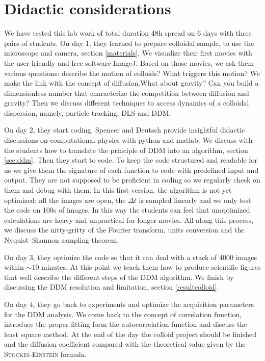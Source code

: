 \documentclass[%
 aip,
 jmp,%
 amsmath,amssymb,
reprint,%
]{revtex4-1}
\begin{document}
\section{\label{didac}Didactic considerations}
We have tested this lab work of total duration 48h spread on 6 days with three pairs of students. On day 1, they learned to prepare colloidal sample, to use the microscope and camera, section \ref{materials}. We visualize their first movies with the user-friendly and free software  ImageJ. Based on those movies, we ask them various questions: describe the motion of colloids? What triggers this motion? We make the link with the concept of diffusion.What about gravity? Can you build a dimensionless number that characterize the competition between diffusion and gravity? Then we discuss different techniques to access dynamics of a colloidal dispersion, namely, particle tracking, DLS and DDM.

On day 2, they start coding. Spencer and Deutsch provide insightful didactic discussions on computational physics with python\cite{ajp2014deutsh} and matlab\cite{ajp2005spencer}. We discuss with the students how to translate the principle of DDM into an algorithm, section \ref{sec:ddm}. Then they start to code. To keep the code structured and readable for us we give them the signature of each function to code with predefined input and output. They are not supposed to be proficient in coding so we regularly check on them and debug with them. In this first version, the algorithm is not yet optimized: all the images are open, the $\Delta t$ is sampled linearly and we only test the code on 100s of images. In this way the students can feel that unoptimized  calculations are heavy and unpractical for longer movies. All along this process, we discuss the nitty-gritty of the Fourier transform, units conversion and the Nyquist–Shannon sampling theorem.

On day 3, they optimize the code so that it can deal with a stack of 4000 images within $\sim$10 minutes. At this point we teach them how to produce scientific figures that well describe the different steps of the DDM algorithm. We finish by discussing the DDM resolution and limitation, section \ref{resultcolloid}.

On day 4, they go back to experiments and optimize the acquisition parameters for the DDM analysis. We come back to the concept of correlation function, introduce the proper fitting form the autocorrelation function and discuss the least square method. At the end of the day the colloid project should be finished and the diffusion coefficient compared with the theoretical value given by the \textsc{Stockes-Einstein} formula.
\end{document}
